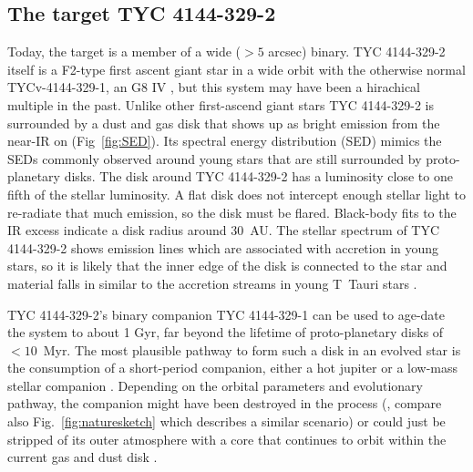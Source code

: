 \documentclass[letterpaper,11pt]{article}
\begin{document}
\subsection*{The target TYC 4144-329-2}

Today, the target is a member of a wide ($> 5$ arcsec) binary. TYC 4144-329-2 itself is a F2-type first ascent giant star in a wide orbit with the otherwise normal  TYCv-4144-329-1, an G8 IV \cite{2009ApJ...696.1964M}, but this system may have been a hirachical multiple in the past. Unlike other first-ascend giant stars TYC 4144-329-2 is surrounded by a dust and gas disk that shows up as bright emission from the near-IR on (Fig~\ref{fig:SED}). Its spectral energy distribution (SED) mimics the SEDs commonly observed around young stars that are still surrounded by proto-planetary disks. The disk around TYC 4144-329-2 has a luminosity close to one fifth of the stellar luminosity. A flat disk does not intercept enough stellar light to re-radiate that much emission, so the disk must be flared. Black-body fits to the IR excess indicate a disk radius around 30~AU. The stellar spectrum of TYC 4144-329-2 shows emission lines which are associated with accretion in young stars, so it is likely that the inner edge of the disk is connected to the star and material falls in similar to the accretion streams in young T~Tauri stars \cite{2009ApJ...696.1964M}. 

TYC 4144-329-2's binary companion TYC 4144-329-1 can be used to age-date the system \cite{2009ApJ...696.1964M} to about 1 Gyr, far beyond the lifetime of proto-planetary disks of $<10$~Myr. The most plausible pathway to form such a disk in an evolved star is the consumption of a short-period companion, either a hot jupiter or a low-mass stellar companion \cite{2009ApJ...696.1964M}. Depending on the orbital parameters and evolutionary pathway, the companion might have been destroyed in the process (\cite{2003ApJ...582.1032J}, compare also Fig.~\ref{fig:naturesketch} which describes a similar scenario) or could just be stripped of its outer atmosphere with a core that continues to orbit within the current gas and dust disk \cite{2003ASPC..293...76W}.
\end{document}
